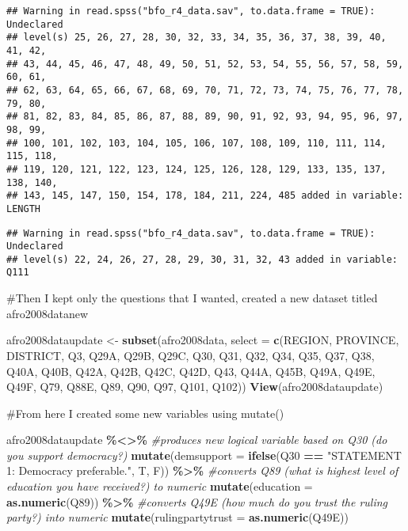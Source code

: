\documentclass[]{article}
\newenvironment{Shaded}{\begin{snugshade}}{\end{snugshade}}
\newcommand{\CommentTok}[1]{\textcolor[rgb]{0.56,0.35,0.01}{\textit{#1}}}
\newcommand{\DataTypeTok}[1]{\textcolor[rgb]{0.13,0.29,0.53}{#1}}
\newcommand{\KeywordTok}[1]{\textcolor[rgb]{0.13,0.29,0.53}{\textbf{#1}}}
\newcommand{\NormalTok}[1]{#1}
\newcommand{\OperatorTok}[1]{\textcolor[rgb]{0.81,0.36,0.00}{\textbf{#1}}}
\newcommand{\StringTok}[1]{\textcolor[rgb]{0.31,0.60,0.02}{#1}}
\begin{document}
\begin{verbatim}
## Warning in read.spss("bfo_r4_data.sav", to.data.frame = TRUE): Undeclared
## level(s) 25, 26, 27, 28, 30, 32, 33, 34, 35, 36, 37, 38, 39, 40, 41, 42,
## 43, 44, 45, 46, 47, 48, 49, 50, 51, 52, 53, 54, 55, 56, 57, 58, 59, 60, 61,
## 62, 63, 64, 65, 66, 67, 68, 69, 70, 71, 72, 73, 74, 75, 76, 77, 78, 79, 80,
## 81, 82, 83, 84, 85, 86, 87, 88, 89, 90, 91, 92, 93, 94, 95, 96, 97, 98, 99,
## 100, 101, 102, 103, 104, 105, 106, 107, 108, 109, 110, 111, 114, 115, 118,
## 119, 120, 121, 122, 123, 124, 125, 126, 128, 129, 133, 135, 137, 138, 140,
## 143, 145, 147, 150, 154, 178, 184, 211, 224, 485 added in variable: LENGTH
\end{verbatim}

\begin{verbatim}
## Warning in read.spss("bfo_r4_data.sav", to.data.frame = TRUE): Undeclared
## level(s) 22, 24, 26, 27, 28, 29, 30, 31, 32, 43 added in variable: Q111
\end{verbatim}

\#Then I kept only the questions that I wanted, created a new dataset
titled afro2008datanew

\begin{Shaded}
\begin{Highlighting}[]
\NormalTok{afro2008dataupdate <{-}}\StringTok{ }\KeywordTok{subset}\NormalTok{(afro2008data, }\DataTypeTok{select =} \KeywordTok{c}\NormalTok{(REGION, PROVINCE, DISTRICT, Q3, Q29A, Q29B, Q29C, Q30, Q31, Q32, Q34, Q35, Q37, Q38, Q40A, Q40B, Q42A, Q42B, Q42C, Q42D, Q43, Q44A, Q45B, Q49A, Q49E, Q49F, Q79, Q88E, Q89, Q90, Q97, Q101, Q102)) }
\KeywordTok{View}\NormalTok{(afro2008dataupdate)}
\end{Highlighting}
\end{Shaded}

\#From here I created some new variables using mutate()

\begin{Shaded}
\begin{Highlighting}[]
\NormalTok{afro2008dataupdate }\OperatorTok{\%<>\%}
\StringTok{  }\CommentTok{\#produces new logical variable based on Q30 (do you support democracy?)}
\StringTok{  }\KeywordTok{mutate}\NormalTok{(}\DataTypeTok{demsupport =} \KeywordTok{ifelse}\NormalTok{(Q30 }\OperatorTok{==}\StringTok{ "STATEMENT 1: Democracy preferable."}\NormalTok{, T, F)) }\OperatorTok{\%>\%}
\StringTok{  }\CommentTok{\#converts Q89 (what is highest level of education you have received?) to numeric}
\StringTok{  }\KeywordTok{mutate}\NormalTok{(}\DataTypeTok{education =} \KeywordTok{as.numeric}\NormalTok{(Q89)) }\OperatorTok{\%>\%}
\StringTok{  }\CommentTok{\#converts Q49E (how much do you trust the ruling party?) into numeric}
\StringTok{  }\KeywordTok{mutate}\NormalTok{(}\DataTypeTok{rulingpartytrust =} \KeywordTok{as.numeric}\NormalTok{(Q49E))}
\end{Highlighting}
\end{Shaded}
\end{document}
